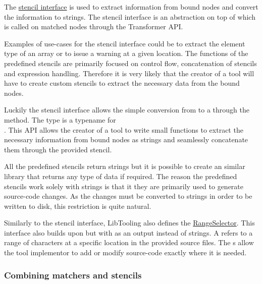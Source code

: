The \href{https://github.com/llvm/llvm-project/blob/main/clang/include/clang/Tooling/Transformer/Stencil.h}{stencil interface} is used to extract information from bound nodes and convert the information to strings. The stencil interface is an abstraction on top of  which is called on matched nodes through the Transformer API. 

Examples of use-cases for the stencil interface could be to extract the element type of an array or to issue a warning at a given location. The functions of the predefined stencils are primarily focused on control flow, concatenation of stencils and expression handling. Therefore it is very likely that the creator of a tool will have to create custom stencils to extract the necessary data from the bound nodes.

Luckily the stencil interface allows the simple conversion from  to a  through the  method. The  type is a typename for \\ . This API allows the creator of a tool to write small functions to extract the necessary information from bound nodes as strings and seamlessly concatenate them through the provided  stencil.

All the predefined stencils return strings but it is possible to create an similar library that returns any type of data if required. The reason the predefined stencils work solely with strings is that it they are primarily used to generate source-code changes. As the changes must be converted to strings in order to be written to disk, this restriction is quite natural. 

Similarly to the stencil interface, LibTooling also defines the \href{https://github.com/llvm/llvm-project/blob/main/clang/include/clang/Tooling/Transformer/RangeSelector.h}{RangeSelector}.
This interface also builds upon  but with  as an output instead of strings. A  refers to a range of characters at a specific location in the provided source files. The s allow the tool implementor to add or modify source-code exactly where it is needed.

\subsubsection*{Combining matchers and stencils}

